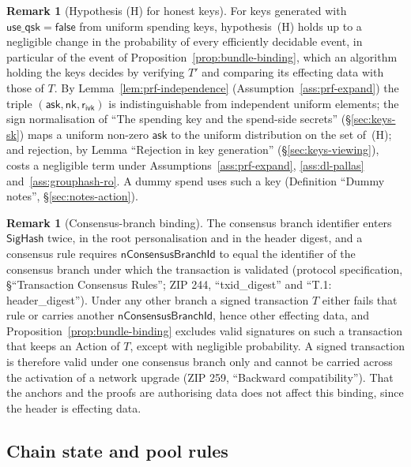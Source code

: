 \documentclass[11pt,a4paper]{article}
\theoremstyle{definition}
\newtheorem{remark}[theorem]{Remark}
\newcommand{\ask}{\ensuremath{\mathsf{ask}}}
\newcommand{\nksym}{\ensuremath{\mathsf{nk}}}
\newcommand{\rivk}{\ensuremath{\mathsf{r_{ivk}}}}
\begin{document}
\begin{remark}[Hypothesis (H) for honest keys]
For keys generated with $\mathsf{use\_qsk} = \mathsf{false}$ from uniform
spending keys, hypothesis~(H) holds up to a negligible change in the
probability of every efficiently decidable event, in particular of the event
of Proposition~\ref{prop:bundle-binding}, which an algorithm holding the
keys decides by verifying $T'$ and comparing its effecting data with those
of $T$. By Lemma~\ref{lem:prf-independence} (Assumption~\ref{ass:prf-expand})
the triple $(\ask, \nksym, \rivk)$ is indistinguishable from independent uniform
elements; the sign normalisation of ``The spending key and the spend-side
secrets'' (\S\ref{sec:keys-sk}) maps a uniform non-zero $\ask$ to the
uniform distribution on the set of~(H); and rejection, by Lemma ``Rejection
in key generation'' (\S\ref{sec:keys-viewing}), costs a negligible term under
Assumptions~\ref{ass:prf-expand}, \ref{ass:dl-pallas}
and~\ref{ass:grouphash-ro}. A dummy spend uses such a key (Definition
``Dummy notes'', \S\ref{sec:notes-action}).
\end{remark}

\begin{remark}[Consensus-branch binding]
The consensus branch identifier enters $\mathsf{SigHash}$ twice, in the root
personalisation and in the header digest, and a consensus rule requires
$\mathsf{nConsensusBranchId}$ to equal the identifier of the consensus branch
under which the transaction is validated (protocol specification,
\S``Transaction Consensus Rules''; ZIP 244, ``txid\_digest'' and ``T.1:
header\_digest''). Under any other branch a signed transaction $T$ either
fails that rule or carries another $\mathsf{nConsensusBranchId}$, hence other
effecting data, and Proposition~\ref{prop:bundle-binding} excludes valid
signatures on such a transaction that keeps an Action of $T$, except with
negligible probability. A signed transaction is therefore valid under one
consensus branch only and cannot be carried across the activation of a
network upgrade (ZIP 259, ``Backward compatibility''). That the anchors and
the proofs are authorising data does not affect this binding, since the
header is effecting data.
\end{remark}

\FloatBarrier
\subsection{Chain state and pool rules}\label{sec:tx-pools}
\end{document}
